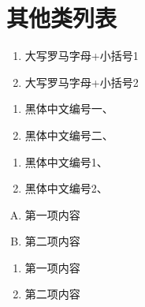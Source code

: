 \section*{其他类列表}
\begin{enumerate}[label=(\Roman*)]
	\item 大写罗马字母+小括号1
	\item 大写罗马字母+小括号2 
\end{enumerate}

\begin{enumerate}[label=\heiti\chinese*、]
	\item 黑体中文编号一、
	\item 黑体中文编号二、
\end{enumerate}

\begin{enumerate}[label=\heiti\arabic*、]
	\item 黑体中文编号1、
	\item 黑体中文编号2、
\end{enumerate}

\begin{enumerate}[A.]
	\item 第一项内容
	\item 第二项内容
\end{enumerate}

\begin{enumerate}[\heiti a.]
	\item 第一项内容
	\item 第二项内容
\end{enumerate}